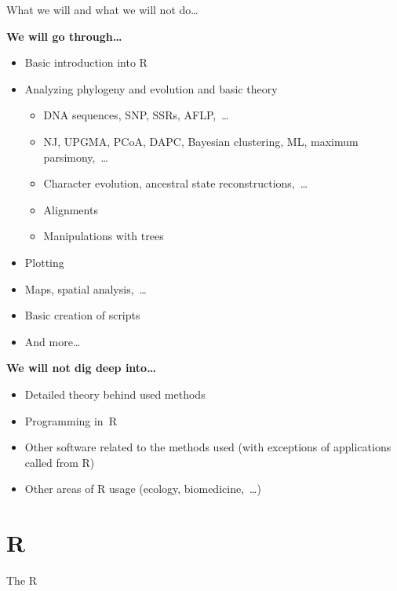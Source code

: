 \documentclass[compress, ucs, xelatex, 11pt, xcolor=svgnames,
  hyperref={
    bookmarks=true,
    unicode=true,
    colorlinks=true,
    pdftitle={Molecular data in R},
    plainpages=false,
    pdfauthor={Vojtech Zeisek},
    pdfsubject={Course about phylogeny and evolution in R},
    pdfcreator={XeLaTeX},
    pdfkeywords={R, evolution, phylogeny, molecular data},
    linkcolor=Tomato,
    anchorcolor=SaddleBrown,
    citecolor=Goldenrod,
    filecolor=DarkMagenta,
    menucolor=Sienna,
    urlcolor=DarkTurquoise,
    pdftex},
  url={hyphens, lowtilde} %
  ]{beamer}
\begin{document}
\begin{frame}{What we will and what we will not do\ldots}
  \begin{multicols}{2}
    \textbf{We will go through\ldots}
    \begin{itemize}
      \item Basic introduction into R
      \item Analyzing phylogeny and evolution and basic theory
      \begin{itemize}
	\item DNA sequences, SNP, SSRs, AFLP,~\ldots
	\item NJ, UPGMA, PCoA, DAPC, Bayesian clustering, ML, maximum parsimony,~\ldots
	\item Character evolution, ancestral state reconstructions,~\ldots
	\item Alignments
	\item Manipulations with trees
      \end{itemize}
      \item Plotting
    \columnbreak
      \item Maps, spatial analysis,~\ldots
      \item Basic creation of scripts
      \item And more\ldots
    \end{itemize}
    \textbf{We will not dig deep into\ldots}
    \begin{itemize}
      \item Detailed theory behind used methods
      \item Programming in~R
      \item Other software related to the methods used (with exceptions of applications called from R)
      \item Other areas of R usage (ecology, biomedicine,~\ldots)
    \end{itemize}
  \end{multicols}
\end{frame}

\section{R}

\begin{frame}{The R}
  \tableofcontents[currentsection, sectionstyle=show/hide, hideothersubsections]
\end{frame}
\end{document}
